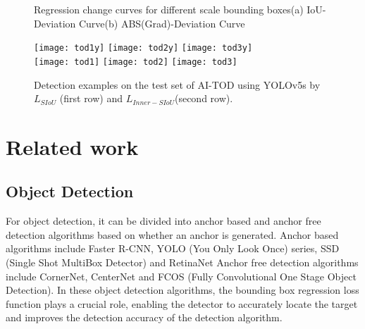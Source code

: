\documentclass[lettersize,journal]{IEEEtran}
\begin{document}
		\begin{figure}[!htbp]
		\centering
		\hfill 
		\caption{Regression change curves for different scale bounding boxes(a) IoU-Deviation Curve(b) ABS(Grad)-Deviation Curve}
		\label{fig_3}
	\end{figure}
\begin{figure*} [t!]
		\centering
		\texttt{[image: tod1y]}
		\hspace{.15in}
		\vspace{.15in}
		\texttt{[image: tod2y]}
		\hspace{.15in}
		\texttt{[image: tod3y]} 
		\\
		\texttt{[image: tod1]}
		\hspace{.15in}
		\texttt{[image: tod2]} 
		\hspace{.13in}
		\texttt{[image: tod3]}
		\caption{Detection examples on the test set of AI-TOD using YOLOv5s by $L_{SIoU}$ (first row) and $L_{Inner-SIoU}$(second row). }
		\label{fig_8} 
	\end{figure*}
	\section{Related work}
	\subsection{Object Detection}
	For object detection, it can be divided into anchor based and anchor free detection algorithms based on whether an anchor is generated. Anchor based algorithms include Faster R-CNN\cite{ref14}, YOLO (You Only Look Once) series\cite{ref10,ref11,ref12,ref13}, SSD (Single Shot MultiBox Detector)\cite{ref15} and RetinaNet\cite{ref16} Anchor free detection algorithms include CornerNet\cite{ref17}, CenterNet\cite{ref18} and FCOS (Fully Convolutional One Stage Object Detection)\cite{ref19}. In these object detection algorithms, the bounding box regression loss function plays a crucial role, enabling the detector to accurately locate the target and improves the detection accuracy of the detection algorithm.
	
\end{document}
